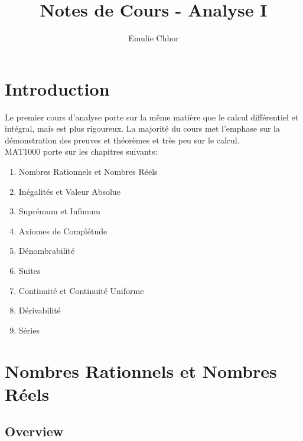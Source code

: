 \documentclass{article}
\begin{document}
\title{Notes de Cours - Analyse I}
\author{Emulie Chhor}
\maketitle

\section*{Introduction}

Le premier cours d'analyse porte sur la même matière que le calcul différentiel
et intégral, mais est plus rigoureux. La majorité du cours met l'emphase sur la
démonstration des preuves et théorèmes et très peu sur le calcul.\\

MAT1000 porte sur les chapitres suivants:

    \begin{enumerate}
	\item Nombres Rationnels et Nombres Réels
	\item Inégalités et Valeur Absolue
	\item Suprémum et Infimum
	\item Axiomes de Complétude
	\item Dénombrabilité
	\item Suites
	\item Continuité et Continuité Uniforme
	\item Dérivabilité
	\item Séries
    \end{enumerate}

\newtheorem{definition}{Définition}[subsection]
\newtheorem{theorem}{Théorème}[subsection]
\newtheorem{corollary}{Corollaire}[subsection]
\newtheorem{lemma}[theorem]{Lemme}
\newtheorem{proposition}{Proposition}[section]
\newtheorem{axiom}{Axiome}
\newtheorem{property}{Propriété}[subsection]
\newtheorem*{remark}{Remarque}
\newtheorem*{problem}{Problème}
\newtheorem*{intuition}{Intuition}

\newcommand{\euler}{e}
\newcommand{\ramuno}{i}
\pagebreak

\section{Nombres Rationnels et Nombres Réels}

\subsection{Overview}
\end{document}
